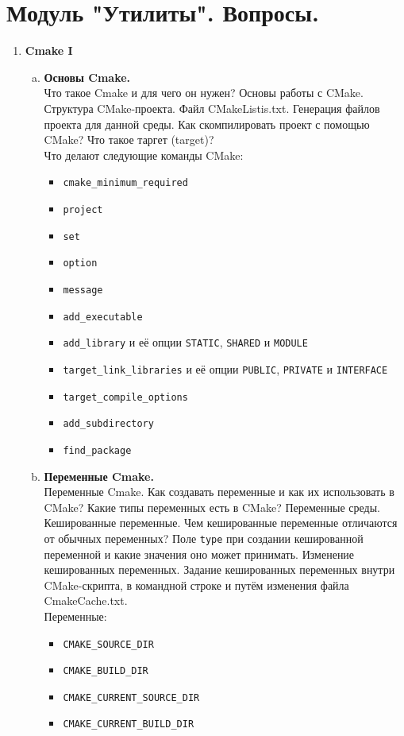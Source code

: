 \documentclass{article}
\begin{document}

\section*{Модуль "Утилиты". Вопросы.}
\begin{enumerate}



\item \textbf{Cmake I}
\begin{enumerate}[a.]

\item \textbf{Основы Cmake.}\\
Что такое Cmake и для чего он нужен? Основы работы с CMake. Структура CMake-проекта. Файл CMakeListis.txt. Генерация файлов проекта для данной среды. 
Как скомпилировать проект с помощью CMake? Что такое таргет (target)?\\
Что делают следующие команды CMake:
\begin{itemize}
\item \texttt{cmake\_minimum\_required}
\item \texttt{project}
\item \texttt{set}
\item \texttt{option}
\item \texttt{message}
\item \texttt{add\_executable}
\item \texttt{add\_library} и её опции \texttt{STATIC}, \texttt{SHARED} и \texttt{MODULE}
\item \texttt{target\_link\_libraries} и её опции \texttt{PUBLIC}, \texttt{PRIVATE} и \texttt{INTERFACE}
\item \texttt{target\_compile\_options}
\item \texttt{add\_subdirectory}
\item \texttt{find\_package}
\end{itemize}


\item \textbf{Переменные Cmake.}\\
Переменные Cmake. Как создавать переменные и как их использовать в CMake? Какие типы переменных есть в CMake?
Переменные среды. Кешированные переменные. Чем кешированные переменные отличаются от обычных переменных? Поле \texttt{type} при создании кешированной переменной и какие значения оно может принимать. Изменение кешированных переменных. Задание кешированных переменных внутри CMake-скрипта, в командной строке и путём изменения файла CmakeCache.txt.\\
Переменные:
\begin{itemize}
\item \texttt{CMAKE\_SOURCE\_DIR}
\item \texttt{CMAKE\_BUILD\_DIR}
\item \texttt{CMAKE\_CURRENT\_SOURCE\_DIR}
\item \texttt{CMAKE\_CURRENT\_BUILD\_DIR}
\end{itemize}


\end{enumerate}
\end{enumerate}
\end{document}
